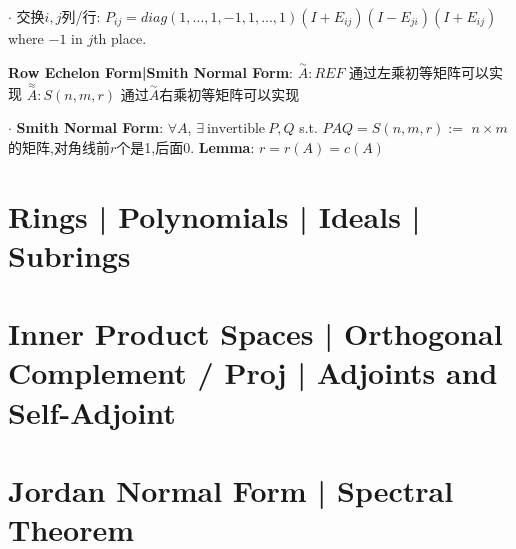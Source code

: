 \documentclass[9pt]{article}
\begin{document}
$\cdot$ {\footnotesize 交换$i,j$列/行}: $P_{ij}=diag(1,...,1,-1,1,...,1)(I+E_{ij})(I-E_{ji})(I+E_{ij})$ where $-1$ in $j$th place.

\vspace{-2pt}
\textbf{Row Echelon Form|Smith Normal Form}: $\stackrel{\sim}{A}:REF$ {\footnotesize 通过左乘初等矩阵可以实现} \quad \quad $\stackrel{\approx}{A}:S(n,m,r)$ {\footnotesize 通过$\stackrel{\sim}{A}$右乘初等矩阵可以实现}

$\cdot$ \textbf{Smith Normal Form}: {\small $\forall A$, $\exists \ \text{invertible} \ P,Q$ s.t. $PAQ=S(n,m,r):=$ {\footnotesize $n\times m$的矩阵,对角线前$r$个是1,后面0}. \quad \textbf{Lemma}: $r=r(A)=c(A)$}



\section{Rings | Polynomials | Ideals | Subrings}

\section{Inner Product Spaces | Orthogonal Complement / Proj | Adjoints and Self-Adjoint}

\section{Jordan Normal Form | Spectral Theorem}
\end{document}

